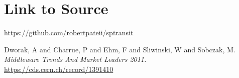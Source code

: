 \documentclass[10pt,journal,compsoc]{IEEEtran}
\begin{document}
\section{Link to Source}
\url{https://github.com/robertpateii/sptransit}




\ifCLASSOPTIONcaptionsoff
  \newpage
\fi





%
%
%
\begin{thebibliography}{3}

Dworak, A and Charrue, P and Ehm, F and Sliwinski, W and Sobczak, M.
\emph{Middleware Trends And Market Leaders 2011.}
\url{https://cds.cern.ch/record/1391410}



\end{thebibliography}

% 
\end{document}
